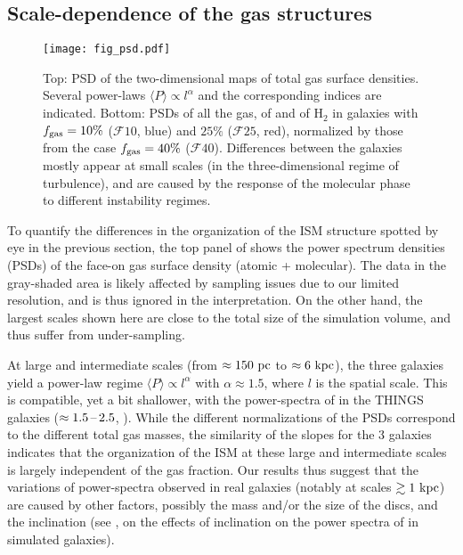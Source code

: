 \documentclass[useAMS,usenatbib]{mnras}
\newcommand{\fgas}{\ensuremath{f_{\rm gas}}\xspace}
\newcommand{\gs}{\ensuremath{\mathcal{F}10}\xspace}
\newcommand{\gm}{\ensuremath{\mathcal{F}25}\xspace}
\newcommand{\gl}{\ensuremath{\mathcal{F}40}\xspace}
\begin{document}
\subsection{Scale-dependence of the gas structures}
\label{sec:psd}

\begin{figure}
\centering
\texttt{[image: fig\_psd.pdf]}
\caption{Top: PSD of the two-dimensional maps of total gas surface densities. Several power-laws $\langle P\rangle \propto l^{\alpha}$ and the corresponding indices are indicated. Bottom: PSDs of all the gas, of \hi and of H$_2$ in galaxies with $\fgas = 10\%$ (\gs, blue) and $25 \%$ (\gm, red), normalized by those from the case $\fgas = 40\%$ (\gl). Differences between the galaxies mostly appear at small scales (in the three-dimensional regime of turbulence), and are caused by the response of the molecular phase to different instability regimes.}
\label{fig:psd}
\end{figure}

To quantify the differences in the organization of the ISM structure spotted by eye in the previous section, the top panel of  shows the power spectrum densities (PSDs) of the face-on gas surface density (atomic + molecular). The data in the gray-shaded area is likely affected by sampling issues due to our limited resolution, and is thus ignored in the interpretation. On the other hand, the largest scales shown here are close to the total size of the simulation volume, and thus suffer from under-sampling.

At large and intermediate scales (from $\approx 150 \mathrm{~pc}$ to $\approx 6 \mathrm{~kpc}$), the three galaxies yield a power-law regime $\langle P\rangle \propto l^{\alpha}$ with $\alpha \approx 1.5$, where $l$ is the spatial scale. This is compatible, yet a bit shallower, with the power-spectra of \hi in the THINGS galaxies ($\approx 1.5\textrm{\,--\,} 2.5$, \citealt{Walter2008, Walker2014, Grisdale2017, Dib2021}). While the different normalizations of the PSDs correspond to the different total gas masses, the similarity of the slopes for the 3 galaxies indicates that the organization of the ISM at these large and intermediate scales is largely independent of the gas fraction. Our results thus suggest that the variations of power-spectra observed in real galaxies (notably at scales $\gtrsim 1 \mathrm{~kpc}$) are caused by other factors, possibly the mass and/or the size of the discs, and the inclination (see \citealt{Dib2021}, on the effects of inclination on the power spectra of \hi in simulated galaxies).
\end{document}
